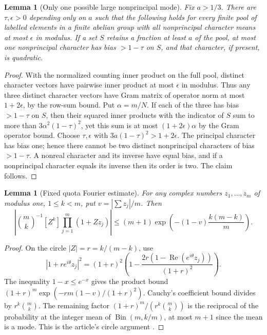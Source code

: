 \documentclass[11pt]{article}
\newtheorem{lemma}[theorem]{Lemma}
\theoremstyle{remark}\newtheorem{remark}[theorem]{Remark}
\newcommand{\abs}[1]{\left|#1\right|}
\newcommand{\Rea}{\operatorname{Re}}
\begin{document}
\begin{lemma}[Only one possible large nonprincipal mode]\label{lem:isolation}
Fix $a>1/3$. There are $\tau,\epsilon>0$ depending only on $a$ such that the following holds for every finite pool of labelled elements in a finite abelian group with all nonprincipal character means at most $\epsilon$ in modulus. If a set $S$ retains a fraction at least $a$ of the pool, at most one nonprincipal character has bias $>1-\tau$ on $S$, and that character, if present, is quadratic.
\end{lemma}
\begin{proof}
With the normalized counting inner product on the full pool, distinct character vectors have pairwise inner product at most $\epsilon$ in modulus. Thus any three distinct character vectors have Gram matrix of operator norm at most $1+2\epsilon$, by the row-sum bound. Put $\alpha=m/N$. If each of the three has bias $>1-\tau$ on $S$, then their squared inner products with the indicator of $S$ sum to more than $3\alpha^2(1-\tau)^2$, yet this sum is at most $(1+2\epsilon)\alpha$ by the Gram operator bound. Choose $\tau,\epsilon$ with $3a(1-\tau)^2>1+2\epsilon$. The principal character has bias one; hence there cannot be two distinct nonprincipal characters of bias $>1-\tau$. A nonreal character and its inverse have equal bias, and if a nonprincipal character equals its inverse then its order is two. The claim follows.
\end{proof}

\begin{lemma}[Fixed quota Fourier estimate]\label{lem:quota}
For any complex numbers $z_1,\dots,z_m$ of modulus one, $1\le k<m$, put $v=|\sum z_j|/m$. Then
\[
 \abs{\binom mk^{-1}[Z^k]\prod_{j=1}^m(1+Zz_j)}
 \le(m+1)\exp\left(-(1-v)\frac{k(m-k)}m\right).
\]
\end{lemma}
\begin{proof}
On the circle $|Z|=r=k/(m-k)$, use
\[
 |1+re^{i\theta}z_j|^2=(1+r)^2\left(1-\frac{2r(1-\Rea(e^{i\theta}z_j))}{(1+r)^2}\right).
\]
The inequality $1-x\le e^{-x}$ gives the product bound $(1+r)^m\exp(-rm(1-v)/(1+r)^2)$. Cauchy's coefficient bound divides by $r^k\binom mk$. The remaining factor $(1+r)^m/(r^k\binom mk)$ is the reciprocal of the probability at the integer mean of $\operatorname{Bin}(m,k/m)$, at most $m+1$ since the mean is a mode. This is the article's circle argument \cite[\texttt{dir:lem:circle}]{Article}.
\end{proof}
\end{document}
